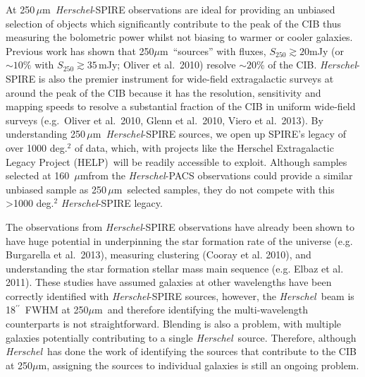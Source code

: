 \documentclass[12pt,a4paper]{article}
\newcommand{\herschel}{{\it Herschel}}
\newcommand{\micron}{$\mu$m}
\newcommand{\arcsec}{$^{\prime\prime}$}
\begin{document}
At 250\,\micron\, \herschel-SPIRE observations are ideal for providing an unbiased selection of objects which significantly contribute to the peak of the CIB thus measuring the bolometric power whilst not biasing to warmer or cooler galaxies. Previous work has shown that 250\micron\ ``sources'' with fluxes, $S_{250}\gtrsim 20$mJy (or
$\sim10\%$ with $S_{250}\gtrsim35$\,mJy; Oliver et
al.\ 2010) resolve $\sim 20\%$ of the CIB. \herschel-SPIRE is also the premier instrument for
wide-field extragalactic surveys at around the peak of the CIB because it has the
resolution, sensitivity and mapping speeds to resolve a substantial
fraction of the CIB in
uniform wide-field surveys (e.g.\ Oliver et al.\ 2010, Glenn et al.\
2010, Viero et al.\ 2013). By understanding 250\,\micron\, \herschel-SPIRE sources, we open up SPIRE's legacy of over 1000 deg.$^2$ of data, which, with projects like the Herschel Extragalactic Legacy Project (HELP)\protect\footnotemark \, will be readily accessible to exploit. Although samples selected at 160\, \micron from the \herschel-PACS observations could provide a similar unbiased sample as 250\,\micron\, selected samples, they do not compete with this \textgreater 1000 deg.$^2$ \herschel-SPIRE legacy.

\protect{}

The observations from \herschel-SPIRE observations have already been shown to have huge potential in underpinning the star formation rate of the universe (e.g. Burgarella et al.\ 2013), measuring clustering (Cooray et al. 2010), and understanding the star formation stellar mass main sequence (e.g. Elbaz et al. 2011). These studies have assumed galaxies at other wavelengths have been correctly identified with \herschel-SPIRE sources, however, the \herschel\ beam is 18\arcsec\ FWHM at
250\micron\ and therefore identifying the multi-wavelength
counterparts is not straightforward. Blending is also a problem, with
multiple galaxies potentially contributing to a single \herschel\
source. Therefore, although \herschel\ has done the work of identifying
the sources that contribute to the CIB at 250\micron, assigning the sources to individual galaxies is still an ongoing problem. 
\end{document}
